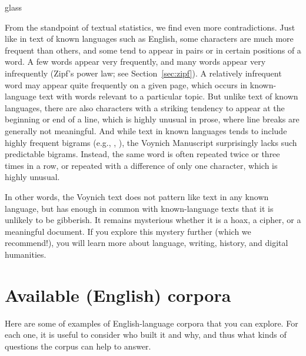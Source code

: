 \begin{tblsfilledsymbol}{}{glass}
\begin{underthehood}
From the standpoint of textual statistics, we find even more
contradictions.  Just like in text of known languages such as English,
some characters are much more frequent than others, and some tend to
appear in pairs or in certain positions of a word.  A few words appear
very frequently, and many words appear very infrequently (Zipf's power
law; see Section~\ref{sec:zipf}).  A relatively infrequent word may
appear quite frequently on a given page, which occurs in
known-language text with words relevant to a particular topic.  But
unlike text of known languages, there are also characters with a
striking tendency to appear at the beginning or end of a line, which
is highly unusual in prose, where line breaks are generally not
meaningful.  And while text in known languages tends to include highly
frequent bigrams (e.g., , ), the Voynich
Manuscript surprisingly lacks such predictable bigrams.  Instead, the
same word is often repeated twice or three times in a row, or repeated with a difference of only one character, which is highly unusual.

In other words, the Voynich text does not pattern like text in any
known language, but has enough in common with known-language texts
that it is unlikely to be gibberish. It remains mysterious whether it is a hoax, a cipher, or a meaningful document.  If you explore this
mystery further (which we recommend!), you will learn more about language,
writing, history, and digital humanities.
\end{underthehood} 
\end{tblsfilledsymbol}


\section{Available (English) corpora}

Here are some of examples of English-language corpora that you can explore.  For each one, it is useful to consider who built it and why, and thus what kinds of questions the corpus can help to answer.

